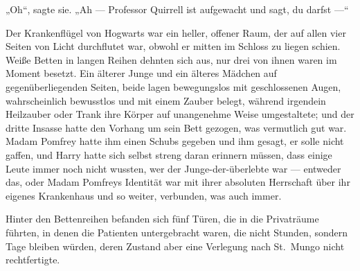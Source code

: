„Oh“, sagte sie.
„Ah — Professor Quirrell ist aufgewacht und sagt, du darfst —“

\later

Der Krankenflügel von Hogwarts war ein heller, offener Raum, der auf allen vier Seiten von Licht durchflutet war, obwohl er mitten im Schloss zu liegen schien. Weiße Betten in langen Reihen dehnten sich aus, nur drei von ihnen waren im Moment besetzt. Ein älterer Junge und ein älteres Mädchen auf gegenüberliegenden Seiten, beide lagen bewegungslos mit geschlossenen Augen, wahrscheinlich bewusstlos und mit einem Zauber belegt, während irgendein Heilzauber oder Trank ihre Körper auf unangenehme Weise umgestaltete; und der dritte Insasse hatte den Vorhang um sein Bett gezogen, was vermutlich gut war. Madam Pomfrey hatte ihm einen Schubs gegeben und ihm gesagt, er solle nicht gaffen, und Harry hatte sich selbst streng daran erinnern müssen, dass einige Leute immer noch nicht wussten, wer der Junge-der-überlebte war — entweder das, oder Madam Pomfreys Identität war mit ihrer absoluten Herrschaft über ihr eigenes Krankenhaus und so weiter, verbunden, was auch immer.

Hinter den Bettenreihen befanden sich fünf Türen, die in die Privaträume führten, in denen die Patienten untergebracht waren, die nicht Stunden, sondern Tage bleiben würden, deren Zustand aber eine Verlegung nach St.~Mungo nicht rechtfertigte.

